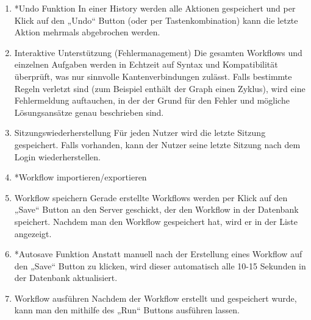 \begin{enumerate}[font={\bfseries}, label={FA\arabic*}0, wide=0pt, labelindent=1em, leftmargin=*]
            \item *Undo Funktion \newline
            In einer History werden alle Aktionen gespeichert und per Klick auf den „Undo“ Button (oder per Tastenkombination) kann die letzte Aktion mehrmals abgebrochen werden.
            
            \item  \label{interaktiveUnterstuetzung:1} Interaktive Unterstützung (Fehlermanagement)\newline
            Die gesamten Workflows und einzelnen Aufgaben werden in Echtzeit auf Syntax und Kompatibilität überprüft, was nur sinnvolle Kantenverbindungen zulässt. Falls bestimmte Regeln verletzt sind (zum Beispiel enthält der Graph einen Zyklus), wird eine Fehlermeldung auftauchen, in der der Grund für den Fehler und mögliche Lösungsansätze genau beschrieben sind.
            
            \item  \label{Sitzungswiederherstellung:1} Sitzungswiederherstellung \newline
            Für jeden Nutzer wird die letzte Sitzung gespeichert.\newline
            Falls vorhanden, kann der Nutzer seine letzte Sitzung nach dem Login wiederherstellen.
            
            \item \label{workflowImExport:1} *Workflow importieren/exportieren \newline 
            
            \item \label{workflowSpeichern:1} Workflow speichern \newline
             Gerade erstellte Workflows werden per Klick auf den „Save“ Button an den Server geschickt, der den Workflow in der Datenbank speichert. Nachdem man den Workflow gespeichert hat, wird er in der Liste angezeigt.
             
            \item   *Autosave Funktion \newline
            Anstatt manuell nach der Erstellung eines Workflow auf den „Save“ Button zu klicken, wird dieser automatisch alle 10-15 Sekunden in der Datenbank aktualisiert.
            
            \item \label{workflowAusfuehren:1} Workflow ausführen \newline
            Nachdem der Workflow erstellt und gespeichert wurde, kann man den mithilfe des „Run“ Buttons ausführen lassen.\
            
            \vspace{5cm}
            
        \end{enumerate} %
        

